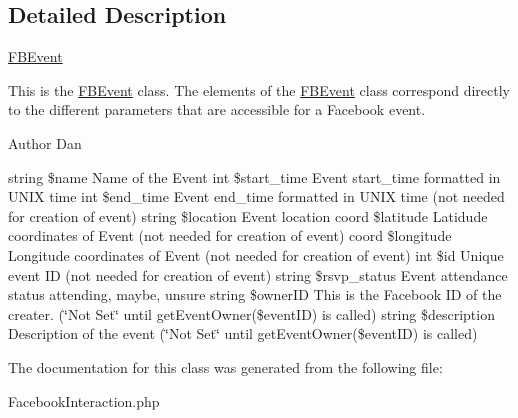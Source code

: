 \subsection{Detailed Description}
\hyperlink{class_f_b_event}{FBEvent}

This is the \hyperlink{class_f_b_event}{FBEvent} class. The elements of the \hyperlink{class_f_b_event}{FBEvent} class correspond directly to the different parameters that are accessible for a Facebook event. \begin{DoxyAuthor}{Author}
Dan
\end{DoxyAuthor}
string \$name Name of the Event int \$start\_\-time Event start\_\-time formatted in UNIX time int \$end\_\-time Event end\_\-time formatted in UNIX time (not needed for creation of event) string \$location Event location coord \$latitude Latidude coordinates of Event (not needed for creation of event) coord \$longitude Longitude coordinates of Event (not needed for creation of event) int \$id Unique event ID (not needed for creation of event) string \$rsvp\_\-status Event attendance status attending, maybe, unsure string \$ownerID This is the Facebook ID of the creater. (\char`\"{}Not Set\char`\"{} until getEventOwner(\$eventID) is called) string \$description Description of the event (\char`\"{}Not Set\char`\"{} until getEventOwner(\$eventID) is called) 

The documentation for this class was generated from the following file:\begin{DoxyCompactItemize}
\item 
FacebookInteraction.php\end{DoxyCompactItemize}
